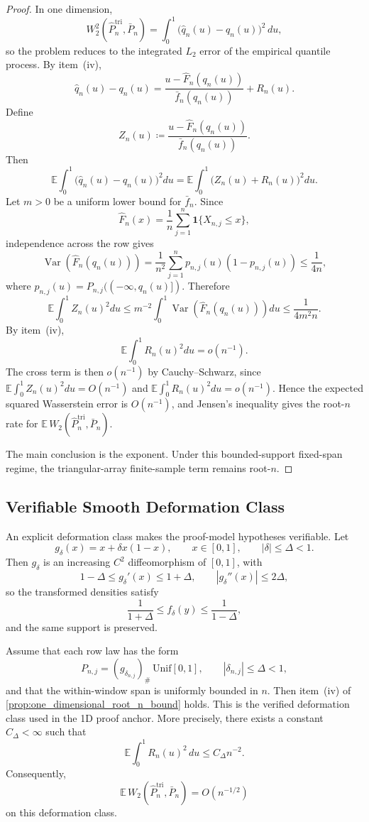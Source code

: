 \begin{proof}
In one dimension,
\[
  W_2^2\!\left(\widehat P_n^{\mathrm{tri}},\bar P_n\right)
  = \int_0^1 \bigl(\widehat q_n(u)-q_n(u)\bigr)^2\,du,
\]
so the problem reduces to the integrated $L_2$ error of the empirical quantile
process. By item~(iv),
\[
  \widehat q_n(u)-q_n(u)
  =
  \frac{u-\widehat F_n(q_n(u))}{\bar f_n(q_n(u))} + R_n(u).
\]
Define
\[
  Z_n(u)\coloneqq \frac{u-\widehat F_n(q_n(u))}{\bar f_n(q_n(u))}.
\]
Then
\[
  \mathbb E\int_0^1 \bigl(\widehat q_n(u)-q_n(u)\bigr)^2du
  =
  \mathbb E\int_0^1 \bigl(Z_n(u)+R_n(u)\bigr)^2du.
\]
Let $m>0$ be a uniform lower bound for $\bar f_n$. Since
\[
  \widehat F_n(x)=\frac1n\sum_{j=1}^n \mathbf 1\{X_{n,j}\le x\},
\]
independence across the row gives
\[
  \operatorname{Var}(\widehat F_n(q_n(u)))
  =
  \frac{1}{n^2}\sum_{j=1}^n p_{n,j}(u)(1-p_{n,j}(u))
  \le \frac{1}{4n},
\]
where $p_{n,j}(u)=P_{n,j}(({-}\infty,q_n(u)])$. Therefore
\[
  \mathbb E\int_0^1 Z_n(u)^2du
  \le
  m^{-2}\int_0^1 \operatorname{Var}(\widehat F_n(q_n(u)))du
  \le \frac{1}{4m^2 n}.
\]
By item~(iv),
\[
  \mathbb E\int_0^1 R_n(u)^2du=o(n^{-1}).
\]
The cross term is then $o(n^{-1})$ by Cauchy--Schwarz, since
\(
  \mathbb E\int_0^1 Z_n(u)^2du=O(n^{-1})
\)
and
\(
  \mathbb E\int_0^1 R_n(u)^2du=o(n^{-1})
\).
Hence the expected squared Wasserstein error is $O(n^{-1})$, and Jensen's
inequality gives the root-$n$ rate for
$\mathbb E\,W_2\!\left(\widehat P_n^{\mathrm{tri}},\bar P_n\right)$.

The main conclusion is the exponent. Under this bounded-support fixed-span
regime, the triangular-array finite-sample term remains root-$n$.
\end{proof}

\subsection{Verifiable Smooth Deformation Class}

An explicit deformation class makes the proof-model hypotheses verifiable. Let
\[
  g_\delta(x)=x+\delta x(1-x), \qquad x\in[0,1], \qquad |\delta|\le \Delta<1.
\]
Then $g_\delta$ is an increasing $C^2$ diffeomorphism of $[0,1]$, with
\[
  1-\Delta \le g_\delta'(x) \le 1+\Delta, \qquad |g_\delta''(x)|\le 2\Delta,
\]
so the transformed densities satisfy
\[
  \frac{1}{1+\Delta}\le f_\delta(y) \le \frac{1}{1-\Delta},
\]
and the same support is preserved.

\begin{corollary}
\label{cor:bahadur_sufficient_conditions_smooth_deformation}
Assume that each row law has the form
\[
  P_{n,j}=(g_{\delta_{n,j}})_\#\,\mathrm{Unif}[0,1],
  \qquad |\delta_{n,j}|\le \Delta<1,
\]
and that the within-window span is uniformly bounded in $n$. Then item~(iv) of
\cref{prop:one_dimensional_root_n_bound} holds. This is the verified deformation
class used in the 1D proof anchor. More precisely, there exists a constant
$C_\Delta<\infty$ such that
\[
  \mathbb E\int_0^1 R_n(u)^2\,du \le C_\Delta n^{-2}.
\]
Consequently,
\[
  \mathbb E\,W_2\!\left(\widehat P_n^{\mathrm{tri}},\bar P_n\right)=O(n^{-1/2})
\]
on this deformation class.
\end{corollary}

